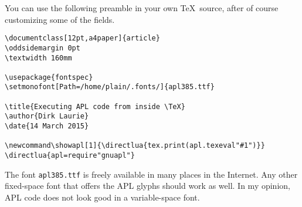 \documentclass[12pt,a4paper]{article}
\newcommand\showapl[1]{\directlua{tex.print(apl.texeval"#1")}}
\begin{document}
You can use the following preamble in your own \TeX\ source, after
of course customizing some of the fields.

\begin{verbatim}
\documentclass[12pt,a4paper]{article}
\oddsidemargin 0pt
\textwidth 160mm

\usepackage{fontspec}
\setmonofont[Path=/home/plain/.fonts/]{apl385.ttf}

\title{Executing APL code from inside \TeX}
\author{Dirk Laurie}
\date{14 March 2015}

\newcommand\showapl[1]{\directlua{tex.print(apl.texeval"#1")}}
\directlua{apl=require"gnuapl"}
\end{verbatim}

The font \texttt{apl385.ttf} is freely available in many places in 
the Internet. Any other fixed-space font that offers the APL glyphs
should work as well. In my opinion, APL code does not look good in
a variable-space font.
\end{document}
